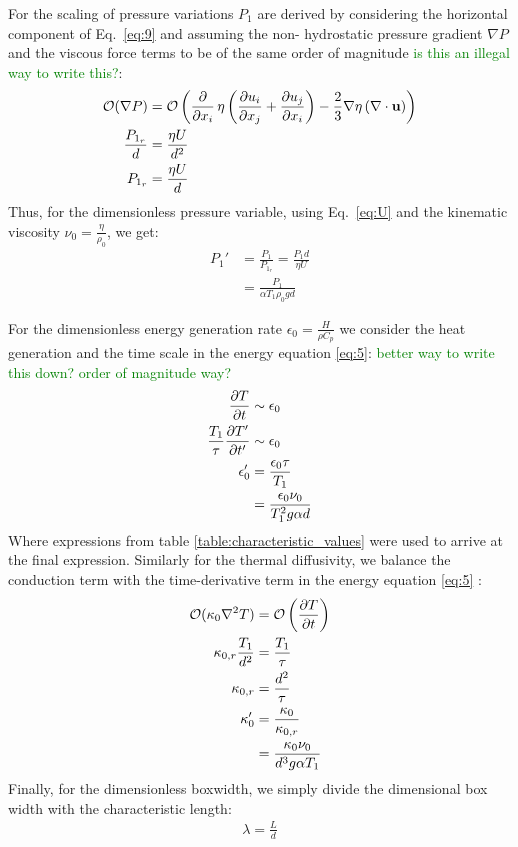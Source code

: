 \documentclass[document.tex]{subfiles}
\begin{document}
For the scaling of pressure variations $P_1$ are derived by considering the horizontal component of Eq.~\eqref{eq:9} and assuming the non-
hydrostatic pressure gradient $\nabla P$ and the viscous force terms to be of the same order of magnitude
\textcolor{green}{is this an illegal way to write this?}: 
\begin{align*}
    \mathcal{O}(\nabla P) &= \mathcal{O}\left(\pdv{x_i}\, \eta \left( \pdv{u_i}{x_j} + \pdv{u_j}{x_i} \right) - \frac{2}{3} \nabla \eta \, (\nabla \cdot \mathbf{u})\right) \\
    \frac{P_{1_r}}{d} &= \frac{\eta U}{d^2} \\
    P_{1_r} &= \frac{\eta U}{d}
\end{align*}
Thus, for the dimensionless pressure variable, using Eq.~\eqref{eq:U} and the kinematic viscosity $\nu_0 = \frac{\eta}{\rho_0}$, we get: 
\begin{align*}
    P_1' &= \frac{P_1}{P_{1_r}} = \frac{P_1 d}{\eta U} \\
    &= \frac{P_1}{\alpha T_1 \rho_0 gd}
\end{align*}

For the dimensionless energy generation rate $\epsilon_0 = \frac{H}{\rho C_p}$ we consider the heat generation and the time scale in the energy equation \eqref{eq:5}: 
\textcolor{green}{better way to write this down? order of magnitude way?}
\begin{align*}
    \pdv{T}{t} &\sim \epsilon_0 \\
    \frac{T_1}{\tau} \pdv{T'}{t'} &\sim \epsilon_0 \\
    \epsilon_0' &= \frac{\epsilon_0 \tau}{T_1} \\
    &= \frac{\epsilon_0 \nu_0}{T_1^2g\alpha d}
\end{align*}
Where expressions from table \ref{table:characteristic_values} were used to arrive at the final expression. 
Similarly for the thermal diffusivity, we balance the conduction term with the time-derivative term in the energy equation \eqref{eq:5} : 
\begin{align*}
    \mathcal{O}(\kappa_0 \nabla^2T) &= \mathcal{O}\left(\pdv{T}{t}\right) \\
    \kappa_{0,r} \frac{T_1}{d^2} &= \frac{T_1}{\tau} \\
    \kappa_{0,r} &= \frac{d^2}{\tau} \\
    \kappa_0' &= \frac{\kappa_0}{\kappa_{0,r}} \\
    &= \frac{\kappa_0 \nu_0}{d^3g\alpha T_1}
\end{align*}
Finally, for the dimensionless boxwidth, we simply divide the dimensional box width with the characteristic length: 
\begin{align*}
    \lambda = \frac{L}{d}
\end{align*}
\end{document}
